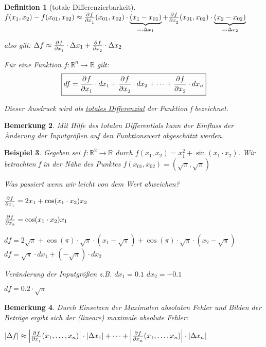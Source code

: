 \documentclass[fontset=ubuntu,11pt,a4paper,fleqn,headsepline]{scrreprt}
\newtheorem{defi}{Definition}[section]
\newtheorem{bemerkung}[defi]{Bemerkung}
\newtheorem{beispiel}[defi]{Beispiel}
\begin{document}
\begin{multicols}{2}
\begin{defi}[totale Differenzierbarkeit]
    \(f(x_1,x_2)-f(x_{01},x_{02})\approx\pd{f}{x_1}(x_{01},x_{02})\cdot\underbrace{(x_1-x_{01})}_{=:\Delta x_1} + \pd{f}{x_2}(x_{01},x_{02})\cdot\underbrace{(x_2-x_{02})}_{=:\Delta x_2}\)
    
    also gilt: \(\Delta f\approx \pd{f}{x_1}\cdot\Delta x_1 + \pd{f}{x_2}\cdot\Delta x_2\)
    
    Für eine Funktion \(f:\mathbb{R}^n\to\mathbb{R}\) gilt:
    \[\boxed{df = \dpd{f}{x_1}\cdot dx_1 + \dpd{f}{x_2}\cdot dx_2 + \cdots + \dpd{f}{x_2}\cdot dx_n}\]
    
    Dieser Ausdruck wird als \underline{totales Differenzial} der Funktion f bezeichnet.
    \end{defi}
    
    \begin{bemerkung}
        Mit Hilfe des totalen Differentials kann der Einfluss der Änderung der Inputgrößen auf den Funktionswert abgeschätzt werden.
    \end{bemerkung}
    
    \begin{beispiel}
        Gegeben sei \(f:\mathbb{R}^2\to\mathbb{R}\) durch \(f(x_1,x_2)=x_1^2+\sin(x_1\cdot x_2)\). Wir betrachten f in der Nähe des Punktes \(f(x_{01},x_{02})=(\sqrt{\pi},\sqrt{\pi})\)
    
        Was passiert wenn wir leicht von dem Wert abweichen?
    
        \(\pd{f}{x_1}=2x_1+\cos(x_1\cdot x_2)x_2\)

        \(\pd{f}{x_2}=\cos(x_1 \cdot x_2)x_1\)
    
        \(df=2\sqrt{\pi}+\cos(\pi)\cdot\sqrt{\pi}\cdot(x_1-\sqrt{\pi})+\cos(\pi)\cdot\sqrt{\pi}\cdot(x_2-\sqrt{\pi}) \)
        \(df=\sqrt{\pi}\cdot dx_1+(-\sqrt{\pi})\cdot dx_2\)
    
        Veränderung der Inputgrößen z.B. \(dx_1=0.1\) \(dx_2=-0.1\)
    
        \(df=0.2\cdot\sqrt{\pi}\)
    \end{beispiel}
    
    \begin{bemerkung}
        Durch Einsetzen der Maximalen absoluten Fehler und Bilden der Beträge ergibt sich der (lineare) maximale absolute Fehler:
    
        \(\left|\Delta f\right|\approx \left|\pd{f}{x_1}(x_1,\dots,x_n)\right|\cdot\left|\Delta x_1\right|+\cdots+\left|\pd{f}{x_n}(x_1,\dots,x_n)\right|\cdot\left|\Delta x_n\right|\)
    \end{bemerkung}
    

\end{multicols}
\end{document}
